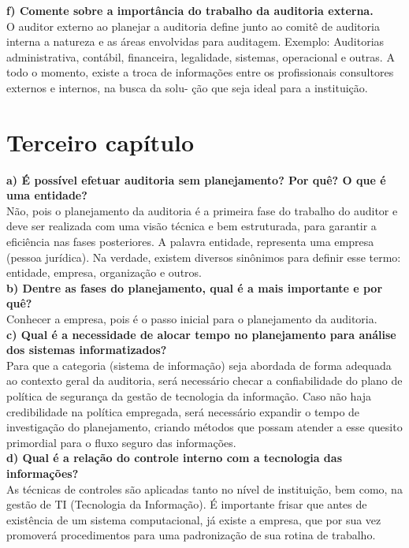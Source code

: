 \documentclass[12pt]{article}
\begin{document}
\textbf{f) Comente sobre a importância do trabalho da auditoria
externa.}
\\
O auditor externo ao planejar a auditoria define junto ao comitê de auditoria interna a natureza e as áreas envolvidas para auditagem. Exemplo:
Auditorias administrativa, contábil, financeira, legalidade, sistemas, operacional e outras. A todo o momento, existe a troca de informações entre os profissionais consultores externos e internos, na busca da solu- ção que seja ideal para a instituição.

\section{Terceiro capítulo}

\textbf{a) É possível efetuar auditoria sem planejamento? Por quê? O que é uma entidade?}
\\
Não, pois o planejamento da auditoria é a primeira fase do trabalho do auditor e deve ser realizada com uma visão técnica e bem estruturada, para garantir a eficiência nas fases posteriores. 
A palavra entidade, representa uma empresa (pessoa jurídica). Na verdade, existem diversos sinônimos para definir esse termo: entidade, empresa, organização e outros.
\\

\textbf{b) Dentre as fases do planejamento, qual é a mais importante e por quê?}
\\
Conhecer a empresa, pois é o passo inicial para o planejamento da auditoria.
\\

\textbf{c) Qual é a necessidade de alocar tempo no planejamento para análise dos sistemas informatizados?}
\\
Para que a categoria (sistema de informação) seja abordada de forma adequada ao contexto geral da auditoria, será necessário checar a confiabilidade do plano de política de segurança da gestão de tecnologia da informação. Caso não haja credibilidade na política empregada, será necessário expandir o tempo de investigação do planejamento, criando métodos que possam atender a esse quesito primordial para o fluxo seguro das informações. 
\\

\textbf{d) Qual é a relação do controle interno com a tecnologia das informações?}
\\
As técnicas de controles são aplicadas tanto no nível de instituição, bem como, na gestão de TI (Tecnologia da Informação). É importante frisar que antes de existência de um sistema computacional, já existe a empresa, que por sua vez promoverá procedimentos para uma padronização de sua rotina de trabalho. 
\\
\end{document}
